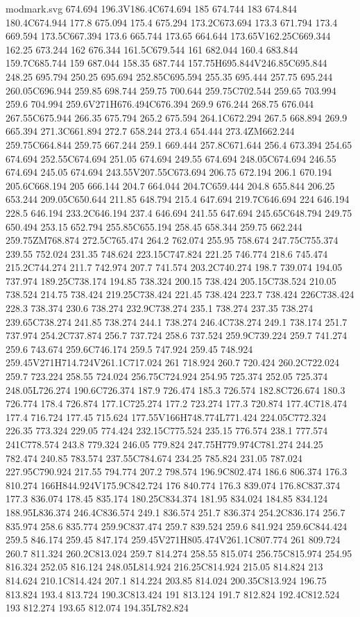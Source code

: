 \begin{filecontents}[noheader]{modmark.svg}
674.694 196.3V186.4C674.694 185 674.744 183 674.844 180.4C674.944 177.8 675.094 175.4 675.294 173.2C673.694 173.3 671.794 173.4 669.594 173.5C667.394 173.6 665.744 173.65 664.644 173.65V162.25C669.344 162.25 673.244 162 676.344 161.5C679.544 161 682.044 160.4 683.844 159.7C685.744 159 687.044 158.35 687.744 157.75H695.844V246.85C695.844 248.25 695.794 250.25 695.694 252.85C695.594 255.35 695.444 257.75 695.244 260.05C696.944 259.85 698.744 259.75 700.644 259.75C702.544 259.65 703.994 259.6 704.994 259.6V271H676.494C676.394 269.9 676.244 268.75 676.044 267.55C675.944 266.35 675.794 265.2 675.594 264.1C672.294 267.5 668.894 269.9 665.394 271.3C661.894 272.7 658.244 273.4 654.444 273.4ZM662.244 259.75C664.844 259.75 667.244 259.1 669.444 257.8C671.644 256.4 673.394 254.65 674.694 252.55C674.694 251.05 674.694 249.55 674.694 248.05C674.694 246.55 674.694 245.05 674.694 243.55V207.55C673.694 206.75 672.194 206.1 670.194 205.6C668.194 205 666.144 204.7 664.044 204.7C659.444 204.8 655.844 206.25 653.244 209.05C650.644 211.85 648.794 215.4 647.694 219.7C646.694 224 646.194 228.5 646.194 233.2C646.194 237.4 646.694 241.55 647.694 245.65C648.794 249.75 650.494 253.15 652.794 255.85C655.194 258.45 658.344 259.75 662.244 259.75ZM768.874 272.5C765.474 264.2 762.074 255.95 758.674 247.75C755.374 239.55 752.024 231.35 748.624 223.15C747.824 221.25 746.774 218.6 745.474 215.2C744.274 211.7 742.974 207.7 741.574 203.2C740.274 198.7 739.074 194.05 737.974 189.25C738.174 194.85 738.324 200.15 738.424 205.15C738.524 210.05 738.524 214.75 738.424 219.25C738.424 221.45 738.424 223.7 738.424 226C738.424 228.3 738.374 230.6 738.274 232.9C738.274 235.1 738.274 237.35 738.274 239.65C738.274 241.85 738.274 244.1 738.274 246.4C738.274 249.1 738.174 251.7 737.974 254.2C737.874 256.7 737.724 258.6 737.524 259.9C739.224 259.7 741.274 259.6 743.674 259.6C746.174 259.5 747.924 259.45 748.924 259.45V271H714.724V261.1C717.024 261 718.924 260.7 720.424 260.2C722.024 259.7 723.224 258.55 724.024 256.75C724.924 254.95 725.374 252.05 725.374 248.05L726.274 190.6C726.374 187.9 726.474 185.3 726.574 182.8C726.674 180.3 726.774 178.4 726.874 177.1C725.274 177.2 723.274 177.3 720.874 177.4C718.474 177.4 716.724 177.45 715.624 177.55V166H748.774L771.424 224.05C772.324 226.35 773.324 229.05 774.424 232.15C775.524 235.15 776.574 238.1 777.574 241C778.574 243.8 779.324 246.05 779.824 247.75H779.974C781.274 244.25 782.474 240.85 783.574 237.55C784.674 234.25 785.824 231.05 787.024 227.95C790.924 217.55 794.774 207.2 798.574 196.9C802.474 186.6 806.374 176.3 810.274 166H844.924V175.9C842.724 176 840.774 176.3 839.074 176.8C837.374 177.3 836.074 178.45 835.174 180.25C834.374 181.95 834.024 184.85 834.124 188.95L836.374 246.4C836.574 249.1 836.574 251.7 836.374 254.2C836.174 256.7 835.974 258.6 835.774 259.9C837.474 259.7 839.524 259.6 841.924 259.6C844.424 259.5 846.174 259.45 847.174 259.45V271H805.474V261.1C807.774 261 809.724 260.7 811.324 260.2C813.024 259.7 814.274 258.55 815.074 256.75C815.974 254.95 816.324 252.05 816.124 248.05L814.924 216.25C814.924 215.05 814.824 213 814.624 210.1C814.424 207.1 814.224 203.85 814.024 200.35C813.924 196.75 813.824 193.4 813.724 190.3C813.424 191 813.124 191.7 812.824 192.4C812.524 193 812.274 193.65 812.074 194.35L782.824 
\end{filecontents}

